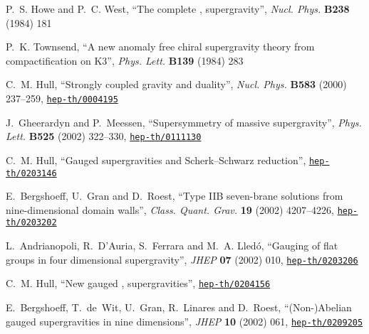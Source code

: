 \documentclass[a4paper,11pt,twoside]{article}
\begin{document}
\begin{thebibliography}{10}
{\sc P.~S. Howe and P.~C. West}, ``The complete \coordHE{}, \coordHE{}
supergravity'',
   {\sl Nucl. Phys.} {\bf B238} (1984)
181

{\sc P.~K. Townsend}, ``A new anomaly free chiral supergravity theory
from
  compactification on K3'',  {\sl Phys. Lett.} {\bf B139} (1984)
283

{\sc C.~M. Hull}, ``Strongly coupled gravity and duality'',  {\sl Nucl.
Phys.}
  {\bf B583} (2000) 237--259,
\href{http://www.arXiv.org/abs/hep-th/0004195}{{\tt hep-th/0004195}}

{\sc J.~Gheerardyn and P.~Meessen}, ``Supersymmetry of massive \coordHE{}
  supergravity'',  {\sl Phys. Lett.} {\bf B525} (2002) 322--330,
\href{http://www.arXiv.org/abs/hep-th/0111130}{{\tt hep-th/0111130}}

{\sc C.~M. Hull}, ``Gauged \coordHE{} supergravities and Scherk--Schwarz
  reduction'',
\href{http://www.arXiv.org/abs/hep-th/0203146}{{\tt hep-th/0203146}}

{\sc E.~Bergshoeff, U.~Gran  and D.~Roest}, ``Type IIB seven-brane
solutions
  from nine-dimensional domain walls'',  {\sl Class. Quant. Grav.} {\bf 19}
  (2002) 4207--4226,
\href{http://www.arXiv.org/abs/hep-th/0203202}{{\tt hep-th/0203202}}

{\sc L.~Andrianopoli, R.~D'Auria, S.~Ferrara  and M.~A. Lled{\'o}}, ``Gauging
  of flat groups in four dimensional supergravity'',  {\sl JHEP} {\bf 07}
  (2002) 010,
\href{http://www.arXiv.org/abs/hep-th/0203206}{{\tt hep-th/0203206}}

{\sc C.~M. Hull}, ``New gauged \coordHE{}, \coordHE{} supergravities'',
\href{http://www.arXiv.org/abs/hep-th/0204156}{{\tt hep-th/0204156}}

{\sc E.~Bergshoeff, T.~de~Wit, U.~Gran, R.~Linares  and D.~Roest},
  ``(Non-)Abelian gauged supergravities in nine dimensions'',  {\sl JHEP} {\bf
  10} (2002) 061,
\href{http://www.arXiv.org/abs/hep-th/0209205}{{\tt hep-th/0209205}}


\end{thebibliography}
\end{document}
